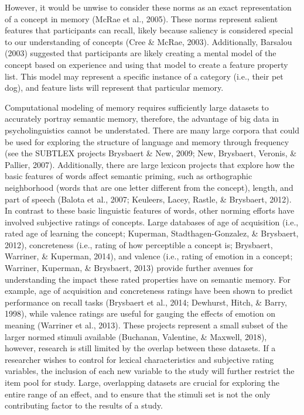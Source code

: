 \documentclass[english,,man]{apa6}
\theoremstyle{definition}
\theoremstyle{definition}
\theoremstyle{definition}
\theoremstyle{remark}
\begin{document}
However, it would be unwise to consider these norms as an exact
representation of a concept in memory (McRae et al., 2005). These norms
represent salient features that participants can recall, likely because
saliency is considered special to our understanding of concepts (Cree \&
McRae, 2003). Additionally, Barsalou (2003) suggested that participants
are likely creating a mental model of the concept based on experience
and using that model to create a feature property list. This model may
represent a specific instance of a category (i.e., their pet dog), and
feature lists will represent that particular memory.

Computational modeling of memory requires sufficiently large datasets to
accurately portray semantic memory, therefore, the advantage of big data
in psycholinguistics cannot be understated. There are many large corpora
that could be used for exploring the structure of language and memory
through frequency (see the SUBTLEX projects Brysbaert \& New, 2009; New,
Brysbaert, Veronis, \& Pallier, 2007). Additionally, there are large
lexicon projects that explore how the basic features of words affect
semantic priming, such as orthographic neighborhood (words that are one
letter different from the concept), length, and part of speech (Balota
et al., 2007; Keuleers, Lacey, Rastle, \& Brysbaert, 2012). In contrast
to these basic linguistic features of words, other norming efforts have
involved subjective ratings of concepts. Large databases of age of
acquisition (i.e., rated age of learning the concept; Kuperman,
Stadthagen-Gonzalez, \& Brysbaert, 2012), concreteness (i.e., rating of
how perceptible a concept is; Brysbaert, Warriner, \& Kuperman, 2014),
and valence (i.e., rating of emotion in a concept; Warriner, Kuperman,
\& Brysbaert, 2013) provide further avenues for understanding the impact
these rated properties have on semantic memory. For example, age of
acquisition and concreteness ratings have been shown to predict
performance on recall tasks (Brysbaert et al., 2014; Dewhurst, Hitch, \&
Barry, 1998), while valence ratings are useful for gauging the effects
of emotion on meaning (Warriner et al., 2013). These projects represent
a small subset of the larger normed stimuli available (Buchanan,
Valentine, \& Maxwell, 2018), however, research is still limited by the
overlap between these datasets. If a researcher wishes to control for
lexical characteristics and subjective rating variables, the inclusion
of each new variable to the study will further restrict the item pool
for study. Large, overlapping datasets are crucial for exploring the
entire range of an effect, and to ensure that the stimuli set is not the
only contributing factor to the results of a study.
\end{document}
